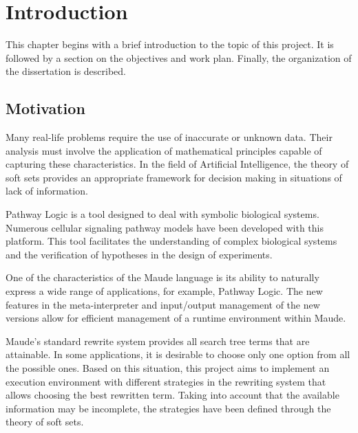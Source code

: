 
\chapter{Introduction}
\label{cap:introduction}




This chapter begins with a brief introduction to the topic of this project. It is followed by a section on the objectives and work plan. Finally, the organization of the dissertation is described.


\section{Motivation}

Many real-life problems require the use of inaccurate or unknown data. Their analysis must involve the application of mathematical principles capable of capturing these characteristics. 
In the field of Artificial Intelligence, the theory of soft sets provides an appropriate framework for decision making in situations of lack of information.

Pathway Logic is a tool designed to deal with symbolic biological systems.
Numerous cellular signaling pathway models have been developed with this platform.
This tool facilitates the understanding of complex biological systems and the verification of hypotheses in the design of experiments.

One of the characteristics of the Maude language is its ability to naturally express a wide range of applications, for example, Pathway Logic.
The new features in the meta-interpreter and input/output management of the new versions allow for efficient management of a runtime environment within Maude.

Maude's standard rewrite system provides all search tree terms that are attainable. 
In some applications, it is desirable to choose only one option from all the possible ones.
Based on this situation, this project aims to implement an execution environment with different strategies in the rewriting system that allows choosing the best rewritten term.
Taking into account that the available information may be incomplete, the strategies have been defined through the theory of soft sets.

